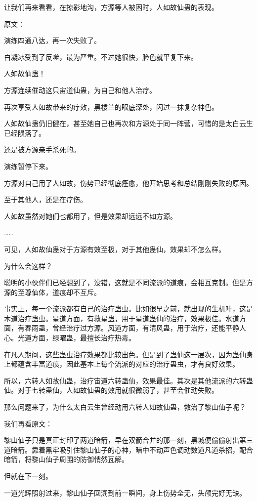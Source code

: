 \begin{this_body}
让我们再来看看，在掠影地沟，方源等人被困时，人如故仙蛊的表现。

原文：

演练四通八达，再一次失败了。

白凝冰受到了反噬，最为严重。不过她很快，脸色就平复下来。

人如故仙蛊！

方源连续催动这只宙道仙蛊，为自己和他人治疗。

再次享受人如故带来的疗效，黑楼兰的眼底深处，闪过一抹复杂神色。

人如故仙蛊仍旧健在，甚至她自己也再次和方源处于同一阵营，可惜的是太白云生已经陨落了。

还是被方源亲手杀死的。

演练暂停下来。

方源对自己用了人如故，伤势已经彻底痊愈，他开始思考和总结刚刚失败的原因。

至于其他人，还是在疗伤。

人如故虽然对她们也都用了，但是效果却远远不如方源。

……

可见，人如故仙蛊对于方源有效至极，对于其他蛊仙，效果却不怎么样。

为什么会这样？

聪明的小伙伴们已经想到了，没错，这就是不同流派的道痕，会相互克制。但是方源的至尊仙体，道痕却不互斥。

事实上，每一个流派都有自己的治疗蛊虫。比如很早之前，就出现的生机叶，这是木道治疗蛊虫。星道方面，有救星蛊，用于星道蛊仙的治疗，效果极佳。水道方面，有春雨蛊，曾经治疗过方源。风道方面，有清风蛊，用于治疗，还能平静人心。光道方面，绿曜蛊，最擅长治疗热毒。

在凡人期间，这些蛊虫治疗效果都比较出色。但是到了蛊仙这一层次，因为蛊仙身上都蕴含丰富道痕，因此基本上每个流派的对应的治疗蛊虫，才有良好效果。

所以，六转人如故仙蛊，治疗宙道六转蛊仙，效果最佳。其次是其他流派的六转蛊仙。对于七转蛊仙，人如故仙蛊的效用就很微弱了，甚至会催动失败。

那么问题来了，为什么太白云生曾经动用六转人如故仙蛊，救治了黎山仙子呢？

我们再看原文：

黎山仙子只是真正封印了两道暗箭，早在双箭合并的那一刻，黑城便偷偷射出第三道暗箭。靠着黑牢吸引住黎山仙子的心神，暗中不动声色调动数道凡道杀招，配合暗箭，将黎山仙子周围的防御悄然瓦解。

但就在下一刻。

一道光辉照射过来，黎山仙子回溯到前一瞬间，身上伤势全无，头颅完好无缺。


\end{this_body}
